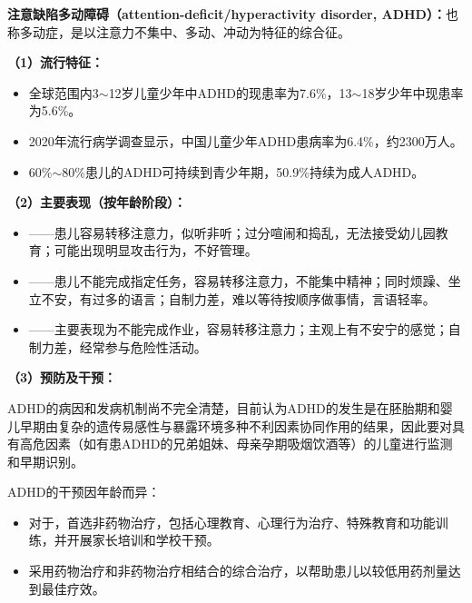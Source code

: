 \begin{keybox}
\textbf{注意缺陷多动障碍（attention-deficit/hyperactivity disorder, ADHD）：}也称多动症，是以注意力不集中、多动、冲动为特征的综合征。

\vspace{4pt}
\textbf{（1）流行特征：}

\begin{itemize}[leftmargin=*]
    \item 全球范围内3$\sim$12岁儿童少年中ADHD的现患率为7.6\%，13$\sim$18岁少年中现患率为5.6\%。
    \item 2020年流行病学调查显示，中国儿童少年ADHD患病率为6.4\%，约2300万人。
    \item 60\%$\sim$80\%患儿的ADHD可持续到青少年期，50.9\%持续为成人ADHD。
\end{itemize}

\vspace{4pt}
\textbf{（2）主要表现（按年龄阶段）：}

\begin{itemize}[leftmargin=*]
    \item {}——患儿容易转移注意力，似听非听；过分喧闹和捣乱，无法接受幼儿园教育；可能出现明显攻击行为，不好管理。
    \item {}——患儿不能完成指定任务，容易转移注意力，不能集中精神；同时烦躁、坐立不安，有过多的语言；自制力差，难以等待按顺序做事情，言语轻率。
    \item {}——主要表现为不能完成作业，容易转移注意力；主观上有不安宁的感觉；自制力差，经常参与危险性活动。
\end{itemize}

\vspace{4pt}
\textbf{（3）预防及干预：}

ADHD的病因和发病机制尚不完全清楚，目前认为ADHD的发生是在胚胎期和婴儿早期由复杂的遗传易感性与暴露环境多种不利因素协同作用的结果，因此要对具有高危因素（如有患ADHD的兄弟姐妹、母亲孕期吸烟饮酒等）的儿童进行监测和早期识别。

ADHD的干预因年龄而异：
\begin{itemize}[leftmargin=*]
    \item 对于，首选非药物治疗，包括心理教育、心理行为治疗、特殊教育和功能训练，并开展家长培训和学校干预。
    \item {}采用药物治疗和非药物治疗相结合的综合治疗，以帮助患儿以较低用药剂量达到最佳疗效。
\end{itemize}
\end{keybox}

